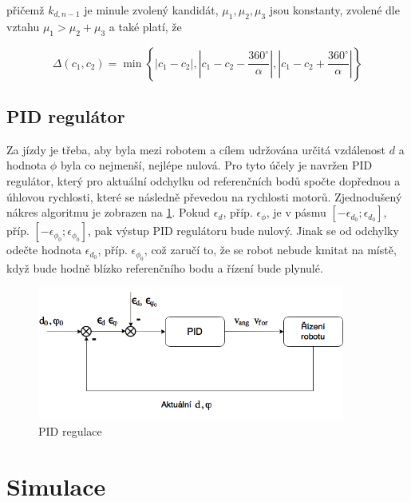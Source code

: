 \documentclass[twoside]{ctuthesis}
\theoremstyle{plain}
\theoremstyle{definition}
\theoremstyle{note}
\begin{document}
přičemž $k_{d, n-1}$ je minule zvolený kandidát, 
$\mu_1, \mu_2, \mu_3$ jsou konstanty, zvolené dle vztahu $\mu_1 > \mu_2 + \mu_3$ a také platí, že

\begin{equation}
\Delta(c_1, c_2) = \min\left\{|c_1 - c_2|, |c_1 - c_2 - \frac{360^{\circ}}{\alpha}|, |c_1 - c_2 + \frac{360^{\circ}}{\alpha}|\right\}
\end{equation}


\section{PID regulátor}

 
Za jízdy je třeba, aby byla mezi robotem a cílem udržována určitá vzdálenost $d$ a hodnota $\phi$ byla co nejmenší, nejlépe nulová. Pro tyto účely je navržen PID regulátor, který pro aktuální odchylku od referenčních bodů spočte dopřednou a úhlovou rychlosti, které se následně převedou na rychlosti motorů. Zjednodušený nákres algoritmu je zobrazen na \ref{pid}.  Pokud $\epsilon_d$, příp. $\epsilon_\phi$, je v pásmu $\left[-\epsilon_{d_0}; \epsilon_{d_0}\right]$, příp. $\left[-\epsilon_{\phi_0}; \epsilon_{\phi_0}\right]$, pak výstup PID regulátoru bude nulový. Jinak se od odchylky odečte hodnota $\epsilon_{d_0}$, příp. $\epsilon_{\phi_0}$, což zaručí to, že se robot nebude kmitat na místě, když bude hodně blízko referenčního bodu a řízení bude plynulé.

\begin{figure}
	\caption{PID regulace}
	
	\label{pid}
	\includegraphics[width=0.9\textwidth, height = 0.4\textwidth]{images/3/PID.png}
\end{figure}


\chapter{Simulace}
\end{document}
